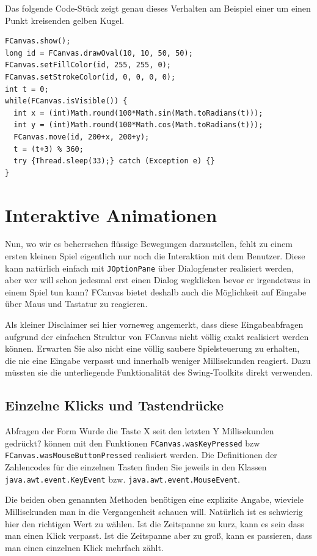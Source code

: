 \documentclass{article}
\newcommand{\enquote}[1]{\glqq{}#1\grqq{}}
\begin{document}
Das folgende Code-Stück zeigt genau dieses Verhalten am Beispiel einer um einen Punkt kreisenden gelben Kugel.

\begin{lstlisting}
FCanvas.show();
long id = FCanvas.drawOval(10, 10, 50, 50);
FCanvas.setFillColor(id, 255, 255, 0);
FCanvas.setStrokeColor(id, 0, 0, 0, 0);
int t = 0;
while(FCanvas.isVisible()) {
  int x = (int)Math.round(100*Math.sin(Math.toRadians(t)));
  int y = (int)Math.round(100*Math.cos(Math.toRadians(t)));
  FCanvas.move(id, 200+x, 200+y);
  t = (t+3) % 360;
  try {Thread.sleep(33);} catch (Exception e) {}
}
\end{lstlisting}

\section{Interaktive Animationen}
Nun, wo wir es beherrschen flüssige Bewegungen darzustellen, fehlt zu einem ersten kleinen Spiel eigentlich nur noch die Interaktion mit dem Benutzer. Diese kann natürlich einfach mit {\tt JOptionPane} über Dialogfenster realisiert werden, aber wer will schon jedesmal erst einen Dialog wegklicken bevor er irgendetwas in einem Spiel tun kann? FCanvas bietet deshalb auch die Möglichkeit auf Eingabe über Maus und Tastatur zu reagieren.

Als kleiner Disclaimer sei hier vorneweg angemerkt, dass diese Eingabeabfragen aufgrund der einfachen Struktur von FCanvas nicht völlig exakt realisiert werden können. Erwarten Sie also nicht eine völlig saubere Spielsteuerung zu erhalten, die nie eine Eingabe verpasst und innerhalb weniger Millisekunden reagiert. Dazu müssten sie die unterliegende Funktionalität des Swing-Toolkits direkt verwenden.

\subsection{Einzelne Klicks und Tastendrücke}
Abfragen der Form \enquote{Wurde die Taste X seit den letzten Y Millisekunden gedrückt?} können mit den Funktionen {\tt FCanvas.wasKeyPressed} bzw {\tt FCanvas.wasMouseButtonPressed} realisiert werden. Die Definitionen der Zahlencodes für die einzelnen Tasten finden Sie jeweils in den Klassen {\tt java.awt.event.KeyEvent} bzw. {\tt java.awt.event.MouseEvent}.

Die beiden oben genannten Methoden benötigen eine explizite Angabe, wieviele Millisekunden man \enquote{in die Vergangenheit} schauen will. Natürlich ist es schwierig hier den richtigen Wert zu wählen. Ist die Zeitspanne zu kurz, kann es sein dass man einen Klick verpasst. Ist die Zeitspanne aber zu groß, kann es passieren, dass man einen einzelnen Klick mehrfach zählt.
\end{document}
